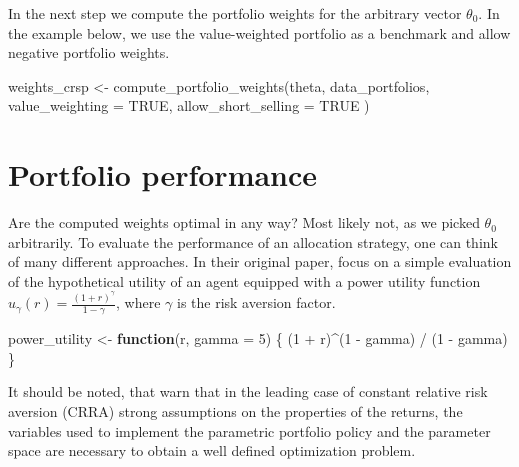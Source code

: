 \documentclass[
]{book}
\newenvironment{Shaded}{\begin{snugshade}}{\end{snugshade}}
\newcommand{\AttributeTok}[1]{\textcolor[rgb]{0.61,0.61,0.61}{#1}}
\newcommand{\ConstantTok}[1]{\textcolor[rgb]{0,0,0}{#1}}
\newcommand{\ControlFlowTok}[1]{\textcolor[rgb]{0.27,0.27,0.27}{\textbf{#1}}}
\newcommand{\DecValTok}[1]{\textcolor[rgb]{0.06,0.06,0.06}{#1}}
\newcommand{\FunctionTok}[1]{\textcolor[rgb]{0,0,0}{#1}}
\newcommand{\NormalTok}[1]{#1}
\newcommand{\OtherTok}[1]{\textcolor[rgb]{0.37,0.37,0.37}{#1}}
\newcommand{\SpecialCharTok}[1]{\textcolor[rgb]{0,0,0}{#1}}
\begin{document}
In the next step we compute the portfolio weights for the arbitrary vector \(\theta_0\). In the example below, we use the value-weighted portfolio as a benchmark and allow negative portfolio weights.

\begin{Shaded}
\begin{Highlighting}[]
\NormalTok{weights\_crsp }\OtherTok{\textless{}{-}} \FunctionTok{compute\_portfolio\_weights}\NormalTok{(theta,}
\NormalTok{  data\_portfolios,}
  \AttributeTok{value\_weighting =} \ConstantTok{TRUE}\NormalTok{,}
  \AttributeTok{allow\_short\_selling =} \ConstantTok{TRUE}
\NormalTok{)}
\end{Highlighting}
\end{Shaded}

\hypertarget{portfolio-performance}{%
\section{Portfolio performance}\label{portfolio-performance}}

Are the computed weights optimal in any way? Most likely not, as we picked \(\theta_0\) arbitrarily. To evaluate the performance of an allocation strategy, one can think of many different approaches. In their original paper, \citet{Brandt2009} focus on a simple evaluation of the hypothetical utility of an agent equipped with a power utility function \(u_\gamma(r) = \frac{(1 + r)^\gamma}{1-\gamma}\), where \(\gamma\) is the risk aversion factor.

\begin{Shaded}
\begin{Highlighting}[]
\NormalTok{power\_utility }\OtherTok{\textless{}{-}} \ControlFlowTok{function}\NormalTok{(r, }\AttributeTok{gamma =} \DecValTok{5}\NormalTok{) \{}
\NormalTok{  (}\DecValTok{1} \SpecialCharTok{+}\NormalTok{ r)}\SpecialCharTok{\^{}}\NormalTok{(}\DecValTok{1} \SpecialCharTok{{-}}\NormalTok{ gamma) }\SpecialCharTok{/}\NormalTok{ (}\DecValTok{1} \SpecialCharTok{{-}}\NormalTok{ gamma)}
\NormalTok{\}}
\end{Highlighting}
\end{Shaded}

It should be noted, that \citet{Gehrig2020} warn that in the leading case of constant relative risk aversion (CRRA) strong assumptions on the properties of the returns, the variables used to implement the parametric portfolio policy and the
parameter space are necessary to obtain a well defined optimization problem.
\end{document}
